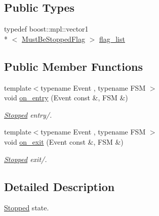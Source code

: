 \subsection*{Public Types}
\begin{DoxyCompactItemize}
\item 
typedef boost\-::mpl\-::vector1\\*
$<$ \hyperlink{structmdt_usbtmc_transfer_handler_state_machine_1_1_must_be_stopped_flag}{Must\-Be\-Stopped\-Flag} $>$ \hyperlink{structmdt_usbtmc_transfer_handler_state_machine_1_1_state_machine___1_1_stopped_abcb072094930a7501a85e8d6b77b23e0}{flag\-\_\-list}
\end{DoxyCompactItemize}
\subsection*{Public Member Functions}
\begin{DoxyCompactItemize}
\item 
{\footnotesize template$<$typename Event , typename F\-S\-M $>$ }\\void \hyperlink{structmdt_usbtmc_transfer_handler_state_machine_1_1_state_machine___1_1_stopped_ae31b1c04530101d50dfca62a9eca9a20}{on\-\_\-entry} (Event const \&, F\-S\-M \&)
\begin{DoxyCompactList}\small\item\em \hyperlink{structmdt_usbtmc_transfer_handler_state_machine_1_1_state_machine___1_1_stopped}{Stopped} entry/. \end{DoxyCompactList}\item 
{\footnotesize template$<$typename Event , typename F\-S\-M $>$ }\\void \hyperlink{structmdt_usbtmc_transfer_handler_state_machine_1_1_state_machine___1_1_stopped_ae562a38f379f8bad6e1dce17fb9dcb80}{on\-\_\-exit} (Event const \&, F\-S\-M \&)
\begin{DoxyCompactList}\small\item\em \hyperlink{structmdt_usbtmc_transfer_handler_state_machine_1_1_state_machine___1_1_stopped}{Stopped} exit/. \end{DoxyCompactList}\end{DoxyCompactItemize}


\subsection{Detailed Description}
\hyperlink{structmdt_usbtmc_transfer_handler_state_machine_1_1_state_machine___1_1_stopped}{Stopped} state. 

